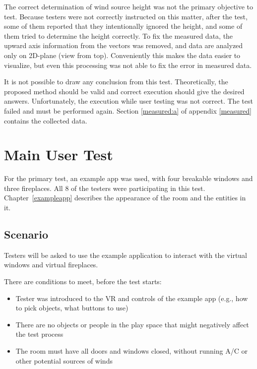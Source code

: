 The correct determination of wind source height was not the primary
objective to test. Because testers were not correctly instructed on this matter,
after the test, some of them reported that they intentionally ignored the
height, and some of them tried to determine the height correctly.
To fix the measured data, the upward axis information from the vectors was
removed, and data are analyzed only on 2D-plane (view from top).
Conveniently this makes the data easier to visualize, but even this
processing was not able to fix the error in measured data.

It is not possible to draw any conclusion from this test. Theoretically, the
proposed method should be valid and correct execution should give the
desired answers. Unfortunately, the execution while user testing was not
correct. The test failed and must be performed again. 
Section \ref{measured:a} of appendix \ref{measured} contains the collected data.


\hypertarget{x-main-user-test}{\section{Main User Test}}
For the primary test, an example app was used, with four breakable windows
and three fireplaces. All 8 of the testers were participating
in this test. Chapter~\ref{exampleapp} describes the appearance of the room 
and the entities in it.

\hypertarget{x-scenario}{\subsection{Scenario}}
Testers will be asked to use the example application to interact with 
the virtual windows and virtual fireplaces.

There are conditions to meet, before the test starts:

\begin{itemize}
    \itemsep0em

\item Tester was introduced to the VR and controls of
the example app (e.g., how to pick objects, what buttons to use)

\item There are no objects or people in the play space that might negatively affect
the test process

\item The room must have all doors and windows closed, without running A/C
or other potential sources of winds

\end{itemize}


